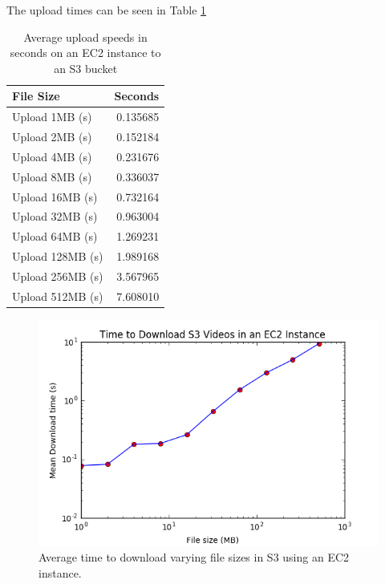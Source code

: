 The upload times can be seen in Table \ref{tab:upload_speed}
\begin{table}[h]
  \begin{tabular}{lr}
\toprule
{File Size} &         Seconds \\
\midrule
Upload 1MB (s)   &  0.135685 \\
Upload 2MB (s)   &  0.152184 \\
Upload 4MB (s)   &  0.231676 \\
Upload 8MB (s)   &  0.336037 \\
Upload 16MB (s)  &  0.732164 \\
Upload 32MB (s)  &  0.963004 \\
Upload 64MB (s)  &  1.269231 \\
Upload 128MB (s) &  1.989168 \\
Upload 256MB (s) &  3.567965 \\
Upload 512MB (s) &  7.608010 \\
\bottomrule
\end{tabular}
\caption{Average upload speeds in seconds on an EC2 instance to an S3 bucket}
\label{tab:upload_speed}
\end{table}


\begin{figure}[h]
  \centering
  \includegraphics[width=.8\textwidth]{figures/s3_download_speed}
  \caption{Average time to download varying file sizes in S3 using an EC2 instance. }
  \label{fig:s3_download_speed}
\end{figure}

